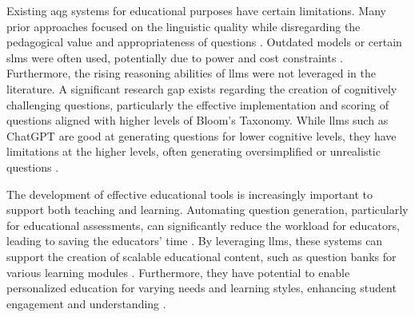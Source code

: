  Existing \ac{aqg} systems for educational purposes have certain limitations. Many prior approaches focused on the linguistic quality while disregarding the pedagogical value and appropriateness of questions \cite{horbach_linguistic_2020,steuer_i_2021}. Outdated models \cite{cheng_treequestion_2024,elkins_how_2023,bhowmick_automating_2023} or certain \ac{slms} \cite{luo_systematic_2023} were often used, potentially due to power and cost constraints \cite{zhuge_twinstar_2025,vu_chatgpt-based_2024}. Furthermore, the rising reasoning abilities of \ac{llms} were not leveraged in the literature. 
A significant research gap exists regarding the creation of cognitively challenging questions, particularly the effective implementation and scoring of questions aligned with higher levels of Bloom's Taxonomy. While \ac{llms} such as ChatGPT \cite{openai_introducing_2022} are good at generating questions for lower cognitive levels, they have limitations at the higher levels, often generating oversimplified or unrealistic questions \cite{duong-trung_bloomllm_2024,elkins_how_2023,scaria_automated_2024}. 


 The development of effective educational tools is increasingly important to support both teaching and learning. Automating question generation, particularly for educational assessments, can significantly reduce the workload for educators, leading to saving the educators' time \cite{biancini_multiple-choice_2024,hang_mcqgen_2024,vu_chatgpt-based_2024,cheng_treequestion_2024}. By leveraging \ac{llms}, these systems can support the creation of scalable educational content, such as question banks for various learning modules \cite{vu_chatgpt-based_2024}. Furthermore, they have potential to enable personalized education for varying needs and learning styles, enhancing student engagement and understanding \cite{hang_mcqgen_2024}.

